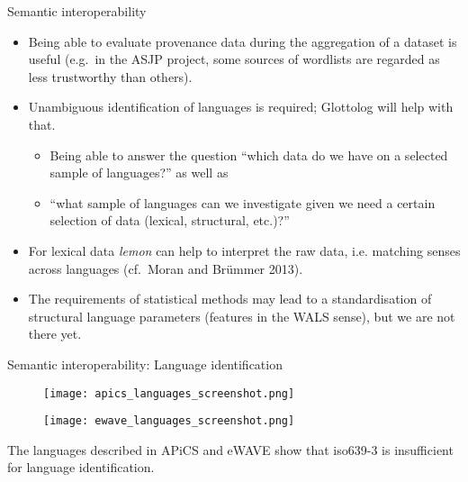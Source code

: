 \documentclass{beamer}
\begin{document}
\begin{frame}{Semantic interoperability}
\begin{itemize}

\item Being able to evaluate provenance data during the aggregation of a dataset is useful
(e.g.~in the ASJP project, some sources of wordlists are regarded as less
trustworthy than others).

\item Unambiguous identification of languages is required; Glottolog will help
with that.
\begin{itemize}
\item Being able to answer the question ``which data do we have on a selected
sample of languages?'' as well as
\item ``what sample of languages can we investigate given we need a certain
selection of data (lexical, structural, etc.)?''
\end{itemize}

\item For lexical data \emph{lemon} can help to interpret the raw data, i.e.
matching senses across languages (cf.~Moran and Brümmer 2013).

\item The requirements of statistical methods may lead to a standardisation of
structural language parameters (features in the WALS sense), but we are not there
yet.

\end{itemize}

\end{frame}

\begin{frame}{Semantic interoperability: Language identification}
\begin{figure}
\texttt{[image: apics\_languages\_screenshot.png]}
\end{figure}
\begin{figure}
\texttt{[image: ewave\_languages\_screenshot.png]}
\end{figure}
The languages described in APiCS and eWAVE show that iso639-3 is insufficient for language identification.
\end{frame}
\end{document}
